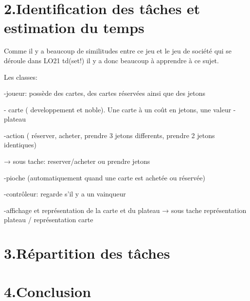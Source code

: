 \documentclass[a4paper]{article}
\begin{document}
\section*{2.Identification des tâches et estimation du temps}
Comme il y a beaucoup de similitudes entre ce jeu et le jeu de société qui se déroule dans LO21 td(set!) il y a donc beaucoup à apprendre à ce sujet.


Les classes:

-joueur: possède des cartes, des cartes réservées ainsi que des jetons

- carte ( developpement et noble).
Une carte à un coût en jetons, une valeur
-plateau


-action ( réserver, acheter, prendre 3 jetons differents, prendre 2 jetons identiques)

→ sous tache: reserver/acheter ou prendre jetons

-pioche (automatiquement quand une carte est achetée ou réservée)



-contrôleur: regarde s’il y a un vainqueur

-affichage et représentation de la carte et du plateau
→ sous tache représentation plateau / représentation carte

\section*{3.Répartition des tâches}

\section*{4.Conclusion}






\end{document}
